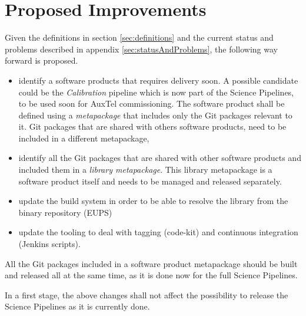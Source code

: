 \newpage
\section{Proposed Improvements}\label{sec:proimp}

Given the definitions in section \ref{sec:definitions} and the current status and problems described in appendix \ref{sec:statusAndProblems}, the following way forward is proposed.

\begin{itemize}
\item identify a software products that requires delivery soon.
A possible candidate could be the \textit{Calibration} pipeline which is now  part of the Science Pipelines, to be used soon for AuxTel commissioning.
The software product shall be defined using a \textit{metapackage} that includes only the Git packages relevant to it.
Git packages that are shared with others software products, need to be included in a different metapackage,
\item identify all the Git packages that are shared with other software products and included them in a \textit{library metapackage}.
This library metapackage is a software product itself and needs to be managed and released separately.
\item update the build system in order to be able to resolve the library from the binary repository (EUPS)
\item update the tooling to deal with tagging (code-kit) and continuous integration (Jenkins scripts).
\end{itemize}

All the Git packages included in a software product metapackage should be built and released all at the same time, as it is done now for the full Science Pipelines.

In a first stage, the above changes shall not affect the possibility to release the Science Pipelines as it is currently done.


